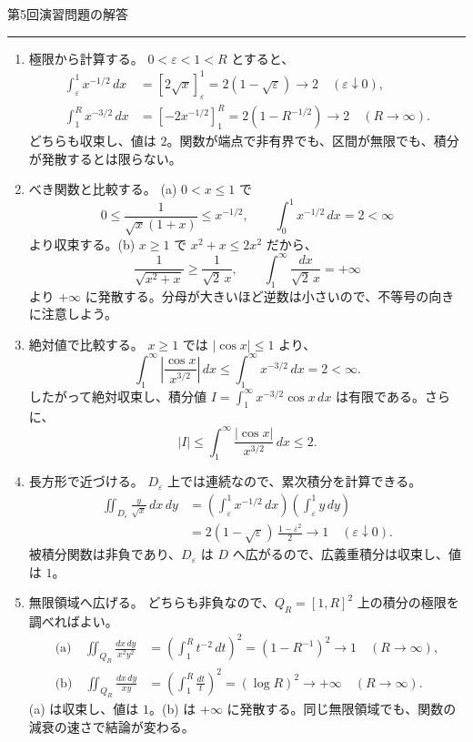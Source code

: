 \documentclass[a4paper,10pt,pdflatex,ja=standard,jafont=ipaex-type1,
  magstyle=real,scale=1]{bxjsarticle}
\newcommand{\coursename}{解析学 II}
\newcommand{\handouttitle}[1]{%
  \begin{center}
    {\Large\color{ink}#1}\par\vspace{3mm}
    {\color{accent}\rule{0.88\linewidth}{0.7pt}}
  \end{center}\vspace{-2mm}}
\newenvironment{problems}
  {\begin{enumerate}[leftmargin=2em,itemsep=3pt,topsep=3pt,parsep=0pt,
    font=\color{accent}]}
  {\end{enumerate}}
\newcommand{\examplelabel}[1]{{\sffamily\mdseries\color{ink}#1}}
\begin{document}
\newpage
\fancyhead[L]{\small\color{ink}\coursename{}・演習問題の解答}
\handouttitle{第5回\quad 演習問題の解答}
\begin{problems}
\setlength{\itemsep}{6pt}
\item \examplelabel{極限から計算する。}
$0<\varepsilon<1<R$ とすると、
$$
 \begin{aligned}
 \int_\varepsilon^1x^{-1/2}\,dx
 &=[2\sqrt{x}]_\varepsilon^1=2(1-\sqrt\varepsilon)
 \longrightarrow2\quad(\varepsilon\downarrow0),\\
 \int_1^Rx^{-3/2}\,dx
 &=[-2x^{-1/2}]_1^R=2(1-R^{-1/2})
 \longrightarrow2\quad(R\to\infty).
 \end{aligned}
$$
どちらも収束し、値は $2$。関数が端点で非有界でも、区間が無限でも、積分が発散するとは限らない。

\item \examplelabel{べき関数と比較する。}
(a) $0<x\le1$ で
$$
 0\le\frac1{\sqrt{x}(1+x)}\le x^{-1/2},\qquad
 \int_0^1x^{-1/2}\,dx=2<\infty
$$
より収束する。(b) $x\ge1$ で $x^2+x\le2x^2$ だから、
$$
 \frac1{\sqrt{x^2+x}}\ge\frac1{\sqrt2\,x},\qquad
 \int_1^\infty\frac{dx}{\sqrt2\,x}=+\infty
$$
より $+\infty$ に発散する。分母が大きいほど逆数は小さいので、不等号の向きに注意しよう。

\item \examplelabel{絶対値で比較する。}
$x\ge1$ では $|\cos x|\le1$ より、
$$
 \int_1^\infty\left|\frac{\cos x}{x^{3/2}}\right|\,dx
 \le\int_1^\infty x^{-3/2}\,dx=2<\infty.
$$
したがって絶対収束し、積分値 $I=\int_1^\infty x^{-3/2}\cos x\,dx$ は有限である。さらに、
$$
 |I|\le\int_1^\infty\frac{|\cos x|}{x^{3/2}}\,dx\le2.
$$

\item \examplelabel{長方形で近づける。}
$D_\varepsilon$ 上では連続なので、累次積分を計算できる。
$$
 \begin{aligned}
 \iint_{D_\varepsilon}\frac{y}{\sqrt{x}}\,dx\,dy
 &=\left(\int_\varepsilon^1x^{-1/2}\,dx\right)
   \left(\int_\varepsilon^1y\,dy\right)\\
 &=2(1-\sqrt\varepsilon)\,\frac{1-\varepsilon^2}{2}
 \longrightarrow1\quad(\varepsilon\downarrow0).
 \end{aligned}
$$
被積分関数は非負であり、$D_\varepsilon$ は $D$ へ広がるので、広義重積分は収束し、値は $1$。

\item \examplelabel{無限領域へ広げる。}
どちらも非負なので、$Q_R=[1,R]^2$ 上の積分の極限を調べればよい。
$$
 \begin{aligned}
 \text{(a)}\quad\iint_{Q_R}\frac{dx\,dy}{x^2y^2}
 &=\left(\int_1^Rt^{-2}\,dt\right)^2=(1-R^{-1})^2
 \longrightarrow1\quad(R\to\infty),\\
 \text{(b)}\quad\iint_{Q_R}\frac{dx\,dy}{xy}
 &=\left(\int_1^R\frac{dt}{t}\right)^2=(\log R)^2
 \longrightarrow+\infty\quad(R\to\infty).
 \end{aligned}
$$
(a) は収束し、値は $1$。(b) は $+\infty$ に発散する。同じ無限領域でも、関数の減衰の速さで結論が変わる。


\end{problems}
\end{document}
